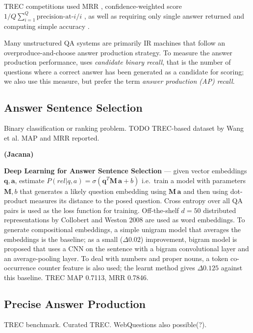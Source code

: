 TREC competitions used MRR \citep{TREC8,TREC9,TREC10},
confidence-weighted score $1/Q \sum_{i=1}^Q \textrm{precision-at-$i$} / i$ \citep{TREC11},
as well as requiring only single answer returned and computing simple accuracy \citep{TREC12}.

Many unstructured QA systems are primarily IR machines that follow
an overproduce-and-choose answer production strategy.  To measure
the answer production performance, \cite{WatsonIR} uses \textit{candidate binary recall},
that is the number of questions where a correct answer has been generated as a candidate
for scoring;
we also use this measure, but prefer the term \textit{answer production (AP) recall}.


\subsection{Answer Sentence Selection}
\label{sec:anssentsel}

Binary classification or ranking problem.
TODO TREC-based dataset by Wang et al.
MAP and MRR reported.

\textbf{(Jacana)} \citep{TreeEdit2013Yao}

\textbf{Deep Learning for Answer Sentence Selection} \citep{Yu2014Deep}
	--- given vector embeddings $\mathbf{q}, \mathbf{a}$, estimate
	$P(rel|q,a) = \sigma(\mathbf{q}^T \mathbf{M}\, \mathbf{a} + b)$
	i.e.\ train a model with parameters $\mathbf{M}, b$ that
	generates a likely question embedding using $\mathbf{M}\, \mathbf{a}$
	and then using dot-product measures its distance to the posed question.
	Cross entropy over all QA pairs is used as the loss function for training.
	Off-the-shelf $d=50$ distributed representations by Collobert and Weston 2008
	are used as word embeddings.
	To generate compositional embeddings,
	a simple unigram model that averages the embeddings is the baseline;
	as a small ($\Delta 0.02$) improvement, bigram model is proposed that uses a CNN
	on the sentence with a bigram convolutional layer and an average-pooling layer.
	To deal with numbers and proper nouns, a token co-occurrence counter
	feature is also used; the learnt method gives $\Delta 0.125$ against this baseline.
	TREC MAP 0.7113, MRR 0.7846.

\subsection{Precise Answer Production}

TREC benchmark.  Curated TREC.  WebQuestions also possible(?).

